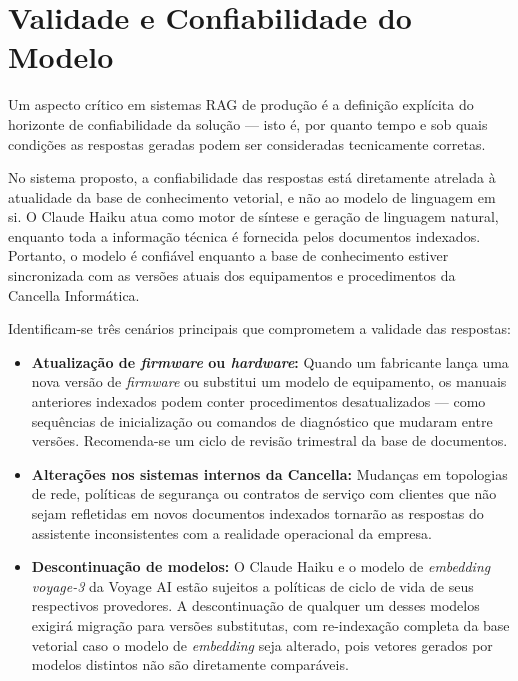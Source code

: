 \documentclass[a4paper,12pt,Times]{article}
\begin{document}
\section{Validade e Confiabilidade do Modelo}

Um aspecto crítico em sistemas RAG de produção é a definição explícita do horizonte de
confiabilidade da solução — isto é, por quanto tempo e sob quais condições as respostas
geradas podem ser consideradas tecnicamente corretas.

No sistema proposto, a confiabilidade das respostas está diretamente atrelada à atualidade
da base de conhecimento vetorial, e não ao modelo de linguagem em si. O Claude Haiku atua
como motor de síntese e geração de linguagem natural, enquanto toda a informação técnica é
fornecida pelos documentos indexados. Portanto, o modelo é confiável enquanto a base de
conhecimento estiver sincronizada com as versões atuais dos equipamentos e procedimentos
da Cancella Informática.

Identificam-se três cenários principais que comprometem a validade das respostas:

\begin{itemize}
    \item \textbf{Atualização de \textit{firmware} ou \textit{hardware}:} Quando um
          fabricante lança uma nova versão de \textit{firmware} ou substitui um modelo de
          equipamento, os manuais anteriores indexados podem conter procedimentos
          desatualizados — como sequências de inicialização ou comandos de diagnóstico que
          mudaram entre versões. Recomenda-se um ciclo de revisão trimestral da base de
          documentos.
    \item \textbf{Alterações nos sistemas internos da Cancella:} Mudanças em topologias de
          rede, políticas de segurança ou contratos de serviço com clientes que não sejam
          refletidas em novos documentos indexados tornarão as respostas do assistente
          inconsistentes com a realidade operacional da empresa.
    \item \textbf{Descontinuação de modelos:} O Claude Haiku e o modelo de
          \textit{embedding} \textit{voyage-3} da Voyage AI estão sujeitos a políticas de
          ciclo de vida de seus respectivos provedores. A descontinuação de qualquer um
          desses modelos exigirá migração para versões substitutas, com re-indexação
          completa da base vetorial caso o modelo de \textit{embedding} seja alterado, pois
          vetores gerados por modelos distintos não são diretamente comparáveis.
\end{itemize}
\end{document}
